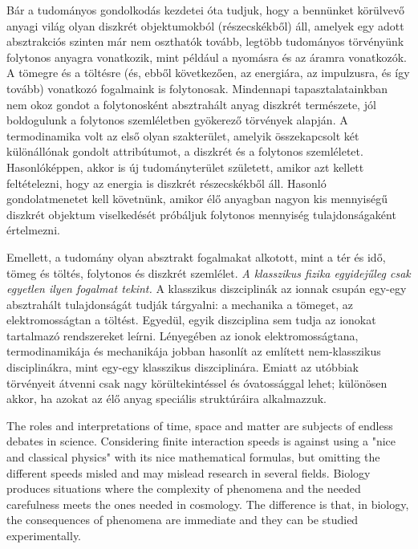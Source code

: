 \else

Bár a tudományos gondolkodás kezdetei óta tudjuk,
hogy a bennünket körülvevő anyagi világ olyan diszkrét 
objektumokból (részecskékből) áll, amelyek egy adott absztrakciós szinten már nem oszthatók tovább, 
legtöbb tudományos törvényünk folytonos anyagra vonatkozik,
mint például a nyomásra és az áramra vonatkozók.
A tömegre és a töltésre (és, ebből következően, az ener\-giára, 
az impulzusra, és így tovább) vonatkozó fogalmaink is folytonosak. Mindennapi tapasztalatainkban
nem okoz gondot a folytonosként absztrahált anyag
diszkrét természete, jól boldogulunk a folytonos szemléletben gyökerező törvények alapján. 
A termodinamika volt az első olyan szakterület, amelyik összekapcsolt két különállónak gondolt attribútumot, a diszkrét és a folytonos szemléletet.
Hasonlóképpen, akkor is új tudományterület született,
amikor azt kellett feltételezni, hogy az energia is diszkrét részecskékből áll.
Hasonló gondolatmenetet kell követnünk, amikor élő anyagban nagyon kis mennyiségű diszk\-rét objektum viselkedését próbáljuk
folytonos mennyiség tulajdonságaként értelmezni.
 
Emellett, a tudomány olyan absztrakt fogalmakat alkotott,
mint a tér és idő, tömeg és töltés, folytonos és diszkrét szemlélet.
\textit{A klasszikus fizika egyidejűleg csak egyetlen ilyen fogalmat tekint.} 
A klasszikus diszciplinák az ionnak csupán egy-egy absztrahált tulajdonságát tudják tárgyalni: a mechanika a tömeget, az elektromosságtan a töltést. Egyedül, egyik diszciplina sem tudja az ionokat tartalmazó rendszereket leírni. Lényegében
az ionok elektromosságtana, termodinamikája és mechanikája
jobban hasonlít az említett nem-klasszikus disciplinákra,
mint egy-egy klasszikus diszciplinára. Emiatt az utóbbiak 
törvényeit átvenni csak nagy körültekintéssel és óvatossággal lehet; különösen akkor, ha azokat az élő anyag speciális struktúráira alkalmazzuk.
\fi

\ifx\magyar\undefined
The roles and interpretations of time, space and matter are subjects of endless debates in science.
Considering finite interaction speeds is against using a "nice and classical physics"
with its nice mathematical formulas, but omitting the different speeds
misled and may mislead research in several fields.
Biology produces situations where the complexity of phenomena
and the needed carefulness meets the ones needed in cosmology.
The difference is that, in biology, the consequences of phenomena are immediate
and they can be studied experimentally.

\else

